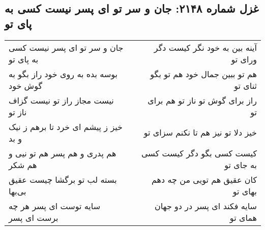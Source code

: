 \begin{center}
\section*{غزل شماره ۲۱۴۸: جان و سر تو ای پسر نیست کسی به پای تو}
\label{sec:2148}
\begin{longtable}{l p{0.5cm} r}
جان و سر تو ای پسر نیست کسی به پای تو
&&
آینه بین به خود نگر کیست دگر ورای تو
\\
بوسه بده به روی خود راز بگو به گوش خود
&&
هم تو ببین جمال خود هم تو بگو ثنای تو
\\
نیست مجاز راز تو نیست گزاف ناز تو
&&
راز برای گوش تو ناز تو هم برای تو
\\
خیز ز پیشم ای خرد تا برهم ز نیک و بد
&&
خیز دلا تو نیز هم تا نکنم سزای تو
\\
هم پدری و هم پسر هم تو نیی و هم شکر
&&
کیست کسی بگو دگر کیست کسی به جای تو
\\
بسته لب تو برگشا چیست عقیق بی‌بها
&&
کان عقیق هم تویی من چه دهم بهای تو
\\
سایه توست ای پسر هر چه برست ای پسر
&&
سایه فکند ای پسر در دو جهان همای تو
\\
\end{longtable}
\end{center}
